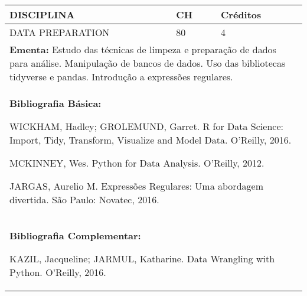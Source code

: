 \documentclass[a4paper, 12pt, openright, oneside, german, french, english, brazil]{abntex2}
\begin{document}
\begin{table}[!h]
  \footnotesize
  \centering
  \begin{tabular}{|p{100mm}|p{10mm}|p{20mm}|}
    \hline
    \textbf{DISCIPLINA} & \textbf{CH} & \textbf{Créditos} \\
    \hline
    DATA PREPARATION & 80 & 4 \\
    \hline
    \multicolumn{3}{|p{130mm}|}{\textbf{Ementa:}  Estudo das técnicas de limpeza e preparação de dados para análise. Manipulação de bancos de dados. Uso das bibliotecas tidyverse e pandas. Introdução a expressões regulares.} \\
    \hline
    \multicolumn{3}{|p{130mm}|}{\textbf{Bibliografia Básica:}

    WICKHAM, Hadley; GROLEMUND, Garret. R for Data Science: Import, Tidy, Transform, Visualize and Model Data. O’Reilly, 2016.

MCKINNEY, Wes. Python for Data Analysis. O’Reilly, 2012.

JARGAS, Aurelio M. Expressões Regulares: Uma abordagem divertida. São Paulo: Novatec, 2016.
} \\
    \hline
    \multicolumn{3}{|p{130mm}|}{\textbf{Bibliografia Complementar:}

    KAZIL, Jacqueline; JARMUL, Katharine. Data Wrangling with Python. O’Reilly, 2016.} \\
    \hline
  \end{tabular}
\end{table}
\end{document}
